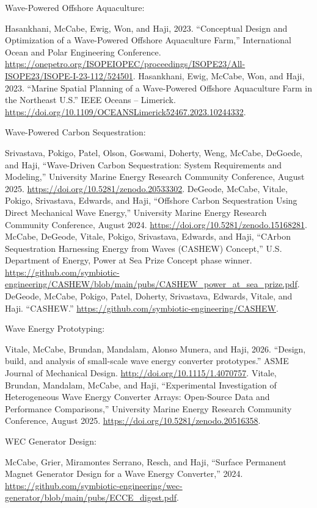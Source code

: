 \noindent
Wave-Powered Offshore Aquaculture:
\begin{typedlist}
     Hasankhani, McCabe, Ewig, Won, and Haji, 2023. ``Conceptual Design and Optimization of a Wave-Powered Offshore Aquaculture Farm,'' International Ocean and Polar Engineering Conference. \url{https://onepetro.org/ISOPEIOPEC/proceedings/ISOPE23/All-ISOPE23/ISOPE-I-23-112/524501}.
     Hasankhani, Ewig, McCabe, Won, and Haji, 2023. ``Marine Spatial Planning of a Wave-Powered Offshore Aquaculture Farm in the Northeast U.S.'' IEEE Oceans – Limerick. \url{https://doi.org/10.1109/OCEANSLimerick52467.2023.10244332}.
\end{typedlist}
%
\noindent
Wave-Powered Carbon Sequestration:
\begin{typedlist}
     Srivastava, Pokigo, Patel, Olson, Goswami, Doherty, Weng, McCabe, DeGoede, and Haji, ``Wave-Driven Carbon Sequestration: System Requirements and Modeling,'' University Marine Energy Research Community Conference, August 2025. \url{https://doi.org/10.5281/zenodo.20533302}.
     DeGeode, McCabe, Vitale, Pokigo, Srivastava, Edwards, and Haji, ``Offshore Carbon Sequestration Using Direct Mechanical Wave Energy,'' University Marine Energy Research Community Conference, August 2024. \url{https://doi.org/10.5281/zenodo.15168281}.
     McCabe, DeGeode, Vitale, Pokigo, Srivastava, Edwards, and Haji, ``CArbon Sequestration Harnessing Energy from Waves (CASHEW) Concept,'' U.S. Department of Energy, Power at Sea Prize Concept phase winner. \url{https://github.com/symbiotic-engineering/CASHEW/blob/main/pubs/CASHEW_power_at_sea_prize.pdf}.
     DeGeode, McCabe, Pokigo, Patel, Doherty, Srivastava, Edwards, Vitale, and Haji. ``CASHEW.'' \url{https://github.com/symbiotic-engineering/CASHEW}.
\end{typedlist}
%
\noindent
Wave Energy Prototyping:
\begin{typedlist}
   Vitale, McCabe, Brundan, Mandalam, Alonso Munera, and Haji, 2026. ``Design, build, and analysis of small-scale wave energy converter prototypes.'' ASME Journal of Mechanical Design. \url{http://doi.org/10.1115/1.4070757}.
   Vitale, Brundan, Mandalam, McCabe, and Haji, ``Experimental Investigation of Heterogeneous Wave Energy Converter Arrays: Open-Source Data and Performance Comparisons,'' University Marine Energy Research Community Conference, August 2025. \url{https://doi.org/10.5281/zenodo.20516358}.
\end{typedlist}
%
\noindent
WEC Generator Design:
\begin{typedlist}
   McCabe, Grier, Miramontes Serrano, Resch, and Haji, ``Surface Permanent Magnet Generator Design for a Wave Energy Converter,'' 2024. \url{https://github.com/symbiotic-engineering/wec-generator/blob/main/pubs/ECCE_digest.pdf}.
\end{typedlist}
